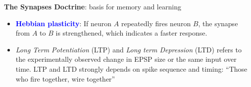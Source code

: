 \documentclass[11pt]{article}
\begin{document}
\noindent \textbf{The Synapses Doctrine}: basis for memory and learning
\begin{itemize}
    \item \textcolor{Blue}{\textbf{Hebbian plasticity}}: If neuron $A$ repeatedly fires neuron $B$, the synapse from $A$ to $B$ is strengthened, which indicates a faster response.
    \item \textit{Long Term Potentiation} (LTP) and \textit{Long term Depression} (LTD) refers to the experimentally observed change in EPSP size or the same input over time. LTP and LTD strongly depends on spike sequence and timing: ``Those who fire together, wire together''
    
    \begin{center}
    \end{center}
\end{itemize}
\end{document}
